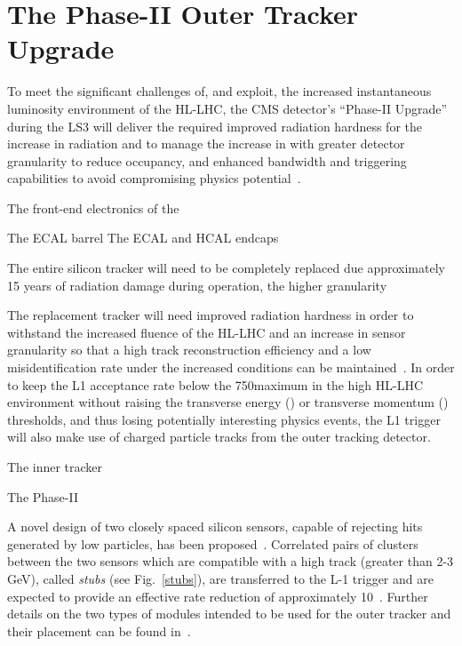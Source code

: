 
\section{The Phase-II Outer Tracker Upgrade}\label{sec:tk-upgrade}

To meet the significant challenges of, and exploit, the increased instantaneous luminosity environment of the HL-LHC, the CMS detector's ``Phase-II Upgrade'' during the LS3 will deliver the required improved radiation hardness for the increase in radiation and to manage the increase in \PU with greater detector granularity to reduce occupancy, and enhanced bandwidth and triggering capabilities to avoid compromising physics potential~\cite{CMSCollaboration:2015zni}.

The front-end electronics of the	

The ECAL barrel  
The ECAL and HCAL endcaps

The entire silicon tracker will need to be completely replaced due approximately 15 years of radiation damage during operation, the higher granularity 

The replacement tracker will need improved radiation hardness in order to withstand the increased fluence of the HL-LHC and an increase in sensor granularity so that a high track reconstruction efficiency and a low misidentification rate under the increased \PU conditions can be maintained~\cite{P2TrackerTDR}.
In order to keep the L1 acceptance rate below the 750\kHz maximum in the high \PU HL-LHC environment without raising the transverse energy (\ET) or transverse momentum (\pT) thresholds, and thus losing potentially interesting physics events, the L1 trigger will also make use of charged particle tracks from the outer tracking detector.
 
The inner tracker  
 
The Phase-II 

A novel design of two closely spaced silicon sensors, capable of rejecting hits generated by low \pT particles, has been proposed~\cite{jjonespixel,markthesis}. Correlated pairs of clusters between the two sensors which are compatible with a high \pT track (greater than 2-3 GeV), called \textit{stubs} (see Fig.~\ref{stubs}), are transferred to the L-1 trigger and are expected to provide an effective rate reduction of approximately 10~\cite{mpessimperf,2dptmoduleconcept}. Further details on the two types of \pT modules intended to be used for the outer tracker and their placement can be found in~\cite{CMS_Upgrade_TP,P2TrackerTDR}.

